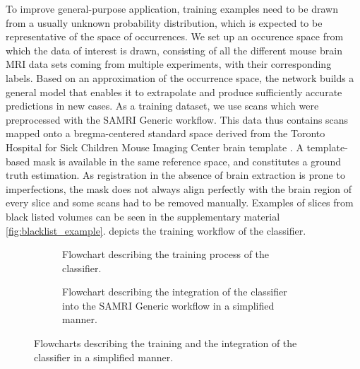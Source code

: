 To improve general-purpose application, training examples need to be drawn from a usually unknown probability distribution, which is expected to be representative of the space of occurrences.
We set up an occurence space from which the data of interest is drawn, consisting of all the different mouse brain MRI data sets coming from multiple experiments, with their corresponding labels.
Based on an approximation of the occurrence space, the network builds a general model that enables it to extrapolate and produce sufficiently accurate predictions in new cases.
As a training dataset, we use scans which were preprocessed with the SAMRI \cite{noauthor_ibt-fmi/samri_2019} Generic workflow.
This data thus contains scans mapped onto a bregma-centered standard \cite{ioanas_optimized_2019} space derived from the Toronto Hospital for Sick Children Mouse Imaging Center brain template \cite{dsu}.
A template-based mask is available in the same reference space, and constitutes a ground truth estimation.
As registration in the absence of brain extraction is prone to imperfections, the mask does not always align perfectly with the brain region of every slice and some scans had to be removed manually.
Examples of slices from black listed volumes can be seen in the supplementary material \cref{fig:blacklist_example}.
 depicts the training workflow of the classifier.

\begin{figure*}[h!]
    \begin{subfigure}{0.45\textwidth}
        \centering
        \vspace{-1.9em}
        \caption{
        Flowchart describing the training process of the classifier.
        }
        \label{fig:training_graph}
    \end{subfigure}
    \begin{subfigure}{0.45\linewidth}
        \centering
        \vspace{-1.9em}
        \caption{
        Flowchart describing the integration of the classifier into the SAMRI Generic workflow in a simplified manner.
        }
        \label{fig:workflow_graph}
    \end{subfigure}\hfill
    \caption{
        Flowcharts describing the training and the integration of the classifier in a simplified manner.
    }
    \label{fig:model_graphs}
\end{figure*}
